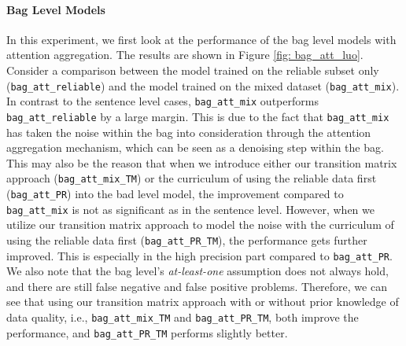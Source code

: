 \paragraph{Bag Level Models}
In this experiment, we first look at the performance of the bag level models with attention aggregation. The results are shown in Figure \ref{fig: bag_att_luo}.
Consider a comparison between the  model trained on the reliable subset only (\texttt{bag\_att\_reliable}) and the model trained on the mixed dataset (\texttt{bag\_att\_mix}).
In contrast to the sentence level cases, \texttt{bag\_att\_mix} outperforms \texttt{bag\_att\_reliable} by a large margin. This is due to the fact that \texttt{bag\_att\_mix} has taken the noise within the bag into consideration through the attention aggregation mechanism, which can be seen as a denoising step within the bag.
This may also be the reason that when we introduce either our transition matrix approach (\texttt{bag\_att\_mix\_TM})  or the curriculum of using the reliable data first (\texttt{bag\_att\_PR}) into the bad level model, the improvement compared to \texttt{bag\_att\_mix}  is not as significant as in the sentence level.
However, when we utilize our transition matrix approach to model the noise with the curriculum of using the reliable data first (\texttt{bag\_att\_PR\_TM}), the performance gets further improved. This is especially in the high precision part compared to \texttt{bag\_att\_PR}.
We also note that the bag level's \textit{at-least-one} assumption does not always hold, and there are still false negative and false positive problems. Therefore, we can see that using our transition matrix approach with or without prior knowledge of data quality, i.e., \texttt{bag\_att\_mix\_TM}  and \texttt{bag\_att\_PR\_TM}, both improve the performance, and \texttt{bag\_att\_PR\_TM} performs slightly better.

